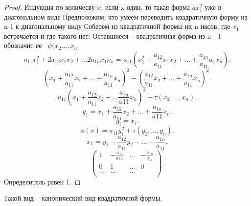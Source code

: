 \documentclass{scrartcl}
\begin{document}
\begin{proof}
    Индукция по количесву $x$, если x один, то такая форма  $ax_1^{2}$ уже в диагональном виде
    Предположим, что умеем переводить квадратичную форму из n-1 к диагональному виду
    Соберем из квадратичной формы их n иксов, где $x_1$ встречается и где такого нет.
    Оставшиеся -- квадратичная форма из n - 1 обозначит ее~ $\psi(x_2\dots,x_{n)}$
    \[
        a_{11} x_1^2 + 2 a_{12} x_1 x_2 + \dots 2 a_{1n} x_1 x_n =
        a_{11} (x_1^2 + \frac{a_{12}}{a_{11}} x_{1} x_2 + \dots + \frac{a_{1n}}{a_{11}} a_{1} x_{n}) 
    .\] 
    \[
        (x_1 + \frac{a_{12}}{a_{11}} x_2 + \dots + \frac{a_{1n}}{a_{11}} x_{n}) ^2 -
        (\frac{a_{12}}{a_{11}} x_{2} + \dots + \frac{a_{1n}}{a_{11}}x_{n})^2
    .\] 
    \[
        a_{11} ( x_1 + \frac{a_{12}}{a_{11}} x_2 + \dots  \frac{a_{1n}}{a_{}11}x_{n})^2 + \tau(x_2,\dots,x_{n})
    .\] 
    \[
    y_1  = x_1 + \frac{a_{12}}{a_{11}}x_{2} + \dots + \frac{a_{1n}}{a11} x_{n}
    .\] 
    \[
    y_{i} = x_{i}
    .\] 
    \[
    \phi(x) = a_{11} y_1^2 + \tau(y_2,\dots,y_{n})
    .\] 
    \[
    x_1 =  y_1 - \frac{a_{12}}{a_{11}} y_2 - \dots - \frac{a_{1n}}{a_{11}}
    .\] 
    \[
    \begin{pmatrix} 
        1 & -\frac{a_{12}}{a11}  & \dots & - \frac{a_{1n}}{a_{11}}\\
        0 & 1 & \dots & 0 \\
        \dots & \dots & \dots &\\
    \end{pmatrix} 
    .\] 
    Определитель равен 1.
\end{proof}
Такой вид -- канонический вид квадратичной формы.
\end{document}
